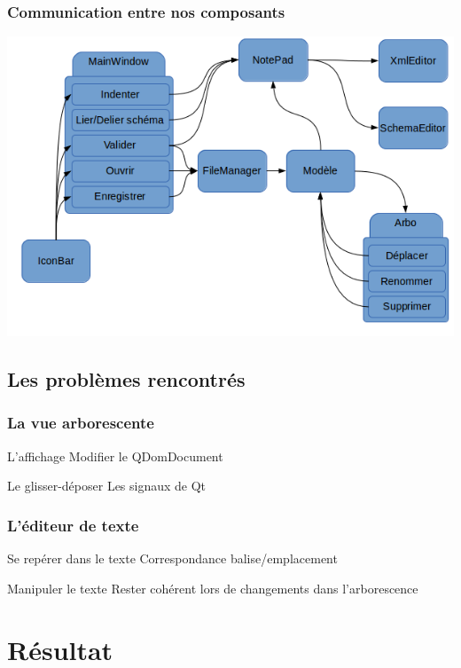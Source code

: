 \documentclass{beamer}
\begin{document}
        \begin{frame}
          \frametitle{Communication entre nos composants}
          \includegraphics[scale=0.5]{images/communication.png}
        \end{frame}

        \subsection{Les problèmes rencontrés}

        \begin{frame}
          \frametitle{La vue arborescente}
          \begin{block}{L'affichage}
            Modifier le QDomDocument
          \end{block}
          \pause
          \begin{block}{Le glisser-déposer}
            Les signaux de Qt
          \end{block}
        \end{frame}

        \begin{frame}
          \frametitle{L'éditeur de texte}
          \begin{block}{Se repérer dans le texte}
            Correspondance balise/emplacement
          \end{block}
          \pause
          \begin{block}{Manipuler le texte}
            Rester cohérent lors de changements dans l'arborescence
          \end{block}
        \end{frame}
          
	\section{Résultat}
\end{document}
